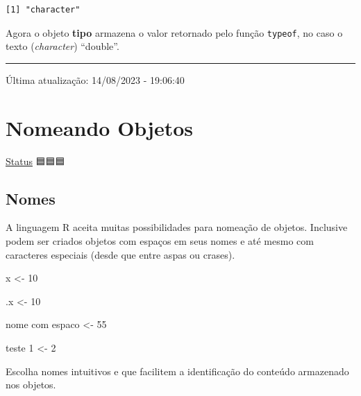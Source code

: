 \documentclass[
  letterpaper,
  DIV=11,
  numbers=noendperiod]{scrreprt}
\newenvironment{Shaded}{\begin{snugshade}}{\end{snugshade}}
\newcommand{\AttributeTok}[1]{\textcolor[rgb]{0.40,0.45,0.13}{#1}}
\newcommand{\DecValTok}[1]{\textcolor[rgb]{0.68,0.00,0.00}{#1}}
\newcommand{\NormalTok}[1]{\textcolor[rgb]{0.00,0.23,0.31}{#1}}
\newcommand{\OtherTok}[1]{\textcolor[rgb]{0.00,0.23,0.31}{#1}}
\newcommand{\StringTok}[1]{\textcolor[rgb]{0.13,0.47,0.30}{#1}}
\begin{document}
\begin{verbatim}
[1] "character"
\end{verbatim}

Agora o objeto \textbf{tipo} armazena o valor retornado pelo função
\texttt{typeof}, no caso o texto (\emph{character}) ``double''.

\begin{center}\rule{0.5\linewidth}{0.5pt}\end{center}

Última atualização: 14/08/2023 - 19:06:40

\hypertarget{nomeando-objetos}{%
\chapter{Nomeando Objetos}\label{nomeando-objetos}}

\protect\hyperlink{status-do-material}{Status} 🟦🟦🟦

\hypertarget{nomes}{%
\section{Nomes}\label{nomes}}

A linguagem R aceita muitas possibilidades para nomeação de objetos.
Inclusive podem ser criados objetos com espaços em seus nomes e até
mesmo com caracteres especiais (desde que entre aspas ou crases).

\begin{Shaded}
\begin{Highlighting}[]
\NormalTok{x }\OtherTok{\textless{}{-}} \DecValTok{10}

\NormalTok{.x }\OtherTok{\textless{}{-}} \DecValTok{10}

\StringTok{\textasciigrave{}}\AttributeTok{nome com espaco}\StringTok{\textasciigrave{}} \OtherTok{\textless{}{-}} \DecValTok{55}

\StringTok{\textquotesingle{}teste 1\textquotesingle{}} \OtherTok{\textless{}{-}} \DecValTok{2}
\end{Highlighting}
\end{Shaded}

\begin{tcolorbox}[enhanced jigsaw, bottomtitle=1mm, colframe=quarto-callout-tip-color-frame, coltitle=black, left=2mm, opacitybacktitle=0.6, opacityback=0, breakable, arc=.35mm, titlerule=0mm, title=\textcolor{quarto-callout-tip-color}{\faLightbulb}\hspace{0.5em}{Nomes Significativos}, colbacktitle=quarto-callout-tip-color!10!white, toptitle=1mm, leftrule=.75mm, bottomrule=.15mm, toprule=.15mm, colback=white, rightrule=.15mm]

Escolha nomes intuitivos e que facilitem a identificação do conteúdo
armazenado nos objetos.

\end{tcolorbox}
\end{document}
